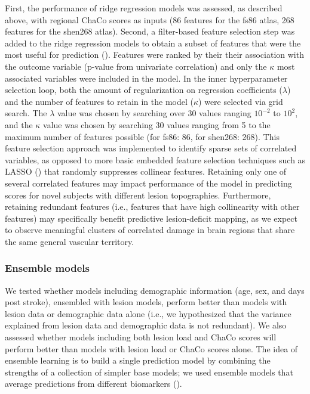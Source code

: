 \documentclass[10pt]{article}
\begin{document}
First, the performance of ridge regression models was assessed, as described above, with regional ChaCo scores as inputs (86 features for the fs86 atlas, 268 features for the shen268 atlas). Second, a filter-based feature selection step was added to the ridge regression models to obtain a subset of features that were the most useful for prediction (\cite{Guyon2003-kj, Hall1999-qr, Pudjihartono2022-zg}). Features were ranked by their their association with the outcome variable (p-value from univariate correlation) and only the $\kappa$ most associated variables were included in the model. In the inner hyperparameter selection loop, both the amount of regularization on regression coefficients ($\lambda$) and the number of features to retain in the model ($\kappa$) were selected via grid search. The $\lambda$ value was chosen by searching over 30 values ranging $10^{-2}$ to $10^2$, and the $\kappa$ value was chosen by searching 30 values ranging from 5 to the maximum number of features possible (for fs86: 86, for shen268: 268).  This feature selection approach was implemented to identify sparse sets of correlated variables, as opposed to more basic embedded feature selection techniques such as LASSO (\cite{Tibshirani1996-sk}) that randomly suppresses collinear features. Retaining only one of several correlated features may impact performance of the model in predicting scores for novel subjects with different lesion topographies. Furthermore, retaining redundant features (i.e., features that have high collinearity with other features) may specifically benefit predictive lesion-deficit mapping, as we expect to observe meaningful clusters of correlated damage in brain regions that share the same general vascular territory.

\subsubsection*{Ensemble models}

We tested whether models including demographic information (age, sex, and days post stroke), ensembled with lesion models, perform better than models with lesion data or demographic data alone (i.e., we hypothesized that the variance explained from lesion data and demographic data is not redundant). We also assessed whether models including both lesion load and ChaCo scores will perform better than models with lesion load or ChaCo scores alone. The idea of ensemble learning is to build a single prediction model by combining the strengths of a collection of simpler base models; we used ensemble models that average predictions from different biomarkers (\cite{Hastie2001-or}).
\end{document}
